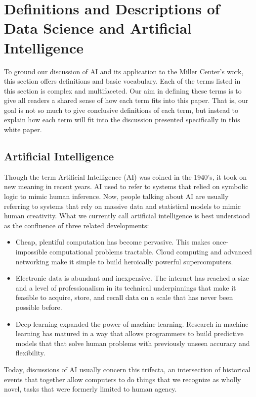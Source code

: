 \documentclass[12pt, oneside]{article}   	%
\begin{document}
\section{Definitions and Descriptions of Data Science and Artificial Intelligence}\label{section.definitions}
To ground our discussion of AI and its application to the Miller Center's work, this section offers definitions and basic vocabulary.  Each of the terms listed in this section is complex and multifaceted.  Our aim in defining these terms is to give all readers a shared sense of how each term fits into this paper.  That is, our goal is not so much to give conclusive definitions of each term, but instead to explain how each term will fit into the discussion presented specifically in this white paper.


\subsection{Artificial Intelligence}\label{section.definitions.artificial-intelligence}
Though the term Artificial Intelligence (AI) was coined in the 1940’s, it took on new meaning in recent years.  AI used to refer to systems that relied on symbolic logic to mimic human inference.  Now, people talking about AI are usually referring to systems that rely on massive data and statistical models to mimic human creativity.  What we currently call artificial intelligence is best understood as the confluence of three related developments:

\begin{itemize}
\item Cheap, plentiful computation has become pervasive.  This makes once-impossible computational problems tractable. Cloud computing and advanced networking make it simple to build heroically powerful supercomputers.
\item Electronic data is abundant and inexpensive.  The internet has reached a size and a level of professionalism in its technical underpinnings that make it feasible to acquire, store, and recall data on a scale that has never been possible before.
\item Deep learning expanded the power of machine learning. Research in machine learning has matured in a way that allows programmers to build predictive models that that solve human problems with previously unseen accuracy and flexibility.   
\end{itemize}

Today, discussions of AI usually concern this trifecta, an intersection of historical events that together allow computers to do things that we recognize as wholly novel, tasks that were formerly limited to human agency.
\end{document}
